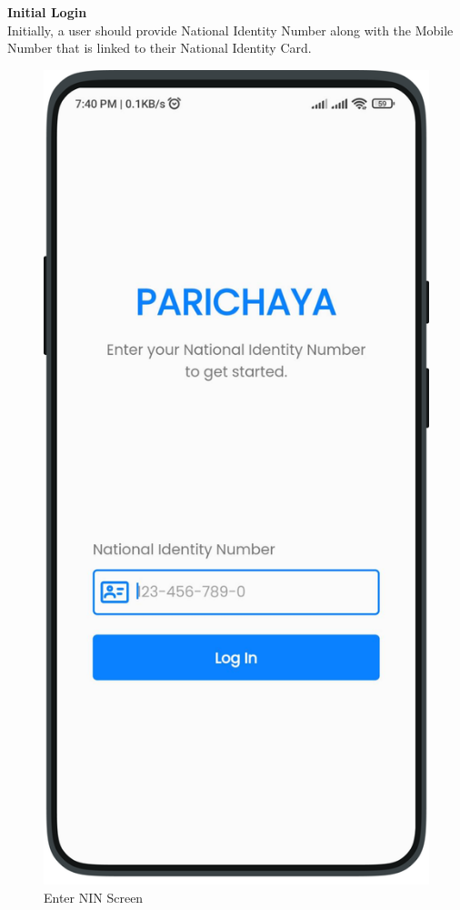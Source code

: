 \textbf{Initial Login}\\
Initially, a user should provide National Identity Number along with the Mobile Number that is linked to their National Identity Card.
\begin{multicols}{2}
        \begin{figure}[H]
        \centering
        \includegraphics[width=0.6\linewidth]{images/results/mobile/LoginNIN.png}
        \caption[Enter NIN Screen]{Enter NIN Screen}
        \label{fig:LoginNIN.png}
        \end{figure}


\end{multicols}
